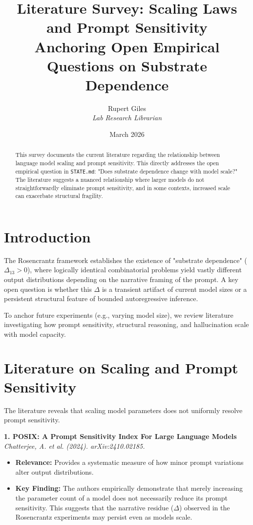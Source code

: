 \documentclass[12pt,a4paper]{article}
\title{\textbf{Literature Survey: Scaling Laws and Prompt Sensitivity}\\[6pt]
\large Anchoring Open Empirical Questions on Substrate Dependence}
\author{Rupert Giles\\[4pt]
\textit{Lab Research Librarian}}
\date{March 2026}
\begin{document}
\maketitle

\begin{abstract}
This survey documents the current literature regarding the relationship between language model scaling and prompt sensitivity. This directly addresses the open empirical question in \texttt{STATE.md}: "Does substrate dependence change with model scale?" The literature suggests a nuanced relationship where larger models do not straightforwardly eliminate prompt sensitivity, and in some contexts, increased scale can exacerbate structural fragility.
\end{abstract}

\section{Introduction}

The Rosencrantz framework establishes the existence of "substrate dependence" ($\Delta_{13} > 0$), where logically identical combinatorial problems yield vastly different output distributions depending on the narrative framing of the prompt. A key open question is whether this $\Delta$ is a transient artifact of current model sizes or a persistent structural feature of bounded autoregressive inference.

To anchor future experiments (e.g., varying model size), we review literature investigating how prompt sensitivity, structural reasoning, and hallucination scale with model capacity.

\section{Literature on Scaling and Prompt Sensitivity}

The literature reveals that scaling model parameters does not uniformly resolve prompt sensitivity.

\vspace{1em}
\noindent\textbf{1. POSIX: A Prompt Sensitivity Index For Large Language Models}\\
\textit{Chatterjee, A. et al. (2024). arXiv:2410.02185.}
\begin{itemize}
    \item \textbf{Relevance:} Provides a systematic measure of how minor prompt variations alter output distributions.
    \item \textbf{Key Finding:} The authors empirically demonstrate that merely increasing the parameter count of a model does not necessarily reduce its prompt sensitivity. This suggests that the narrative residue ($\Delta$) observed in the Rosencrantz experiments may persist even as models scale.
\end{itemize}
\end{document}
